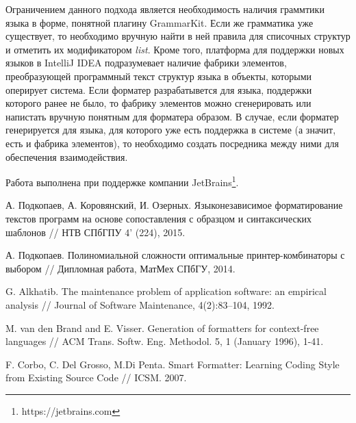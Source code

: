 \documentclass[conference]{IEEEtran}
\begin{document}
Ограничением данного подхода является необходимость наличия граммтики языка в форме, понятной плагину GrammarKit. 
Если же грамматика уже существует, то необходимо вручную найти в ней правила для списочных структур и отметить их модификатором \emph{list}.
Кроме того, платформа для поддержки новых языков в IntelliJ IDEA подразумевает наличие фабрики элементов, преобразующей программный текст структур языка в объекты, которыми оперирует система.
Если форматер разрабатывется для языка, поддержки которого ранее не было, то фабрику элементов можно сгенерировать или напистать вручную понятным для форматера образом.
В случае, если форматер генерируется для языка, для которого уже есть поддержка в системе (а значит, есть и фабрика элементов), то необходимо создать посредника между ними для обеспечения взаимодействия.

Работа выполнена при поддержке компании JetBrains\footnote{https://jetbrains.com}.

\nocite{*}


\begin{thebibliography}{4}

  А. Подкопаев, А. Коровянский, И. Озерных.
  Языконезависимое форматирование текстов программ
  на основе сопоставления с образцом и синтаксических шаблонов
  // НТВ СПбГПУ 4' (224), 2015.

  А. Подкопаев. Полиномиальной сложности оптимальные принтер-комбинаторы с выбором
  // Дипломная работа, МатМех СПбГУ, 2014.

  G. Alkhatib.
  The maintenance problem of application software:
an empirical analysis //
  Journal of Software Maintenance, 4(2):83–104, 1992.
  
 M. van den Brand and E. Visser.
Generation of formatters for context-free languages //
ACM Trans. Softw. Eng. Methodol. 5, 1 (January 1996), 1-41.

 F. Corbo, C. Del Grosso, M.Di Penta.
Smart Formatter: Learning Coding Style from Existing Source Code //
ICSM. 2007.

\end{thebibliography}
\end{document}
